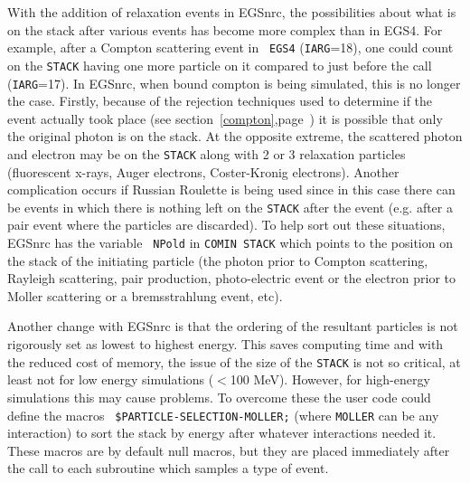 With the addition of relaxation events in EGSnrc, the possibilities
about what is on the stack after various events has become more complex
than in EGS4. For example, after a Compton scattering event in {\tt
EGS4}
({\tt IARG}=18), one could count on the {\tt STACK} having one more particle on it
compared to just before the call ({\tt IARG}=17). In EGSnrc, when bound compton
is being simulated, this is no longer the case.  Firstly, because of the
rejection techniques used to determine if the event actually took place
(see section~\ref{compton},page~\pageref{compton}) it is possible that only the
original photon is on the stack. At the opposite extreme, the scattered
photon and electron may be on the {\tt STACK} along with 2 or 3 relaxation
particles (fluorescent x-rays, Auger electrons, Coster-Kronig electrons).
Another complication occurs if Russian Roulette is being used since in this
case there can be events in which there is nothing left on the {\tt STACK} after
the event (e.g. after a pair event where the particles are discarded).
To help sort out these situations, EGSnrc has the variable {\tt
NPold} in {\tt COMIN STACK} which points to the position on the stack of the initiating particle
(the photon prior to Compton scattering, Rayleigh scattering, pair
production, photo-electric event or the electron prior to Moller scattering
or a bremsstrahlung event, etc).

Another change with EGSnrc is that the ordering of the resultant particles
is not rigorously set as lowest to highest energy.  This saves computing
time and with the reduced cost of memory, the issue of the size of the
{\tt STACK} is not so critical, at least not for low energy simulations ($<$100
MeV).  However, for high-energy simulations this may cause problems. To
overcome these the user code could define the macros {\tt
\$PARTICLE-SELECTION-MOLLER;} (where {\tt MOLLER} can be any interaction)
to sort the stack by energy after whatever interactions needed it. These
macros are by default null macros, but they are placed immediately after
the call to each subroutine which samples a type of event.

